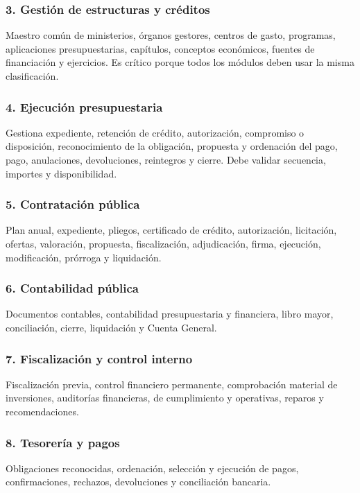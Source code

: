 \documentclass[11pt,a4paper]{article}
\begin{document}
\subsubsection{3. Gestión de estructuras y créditos}
Maestro común de ministerios, órganos gestores, centros de gasto, programas, aplicaciones presupuestarias, capítulos, conceptos económicos, fuentes de financiación y ejercicios. Es crítico porque todos los módulos deben usar la misma clasificación.

\subsubsection{4. Ejecución presupuestaria}
Gestiona expediente, retención de crédito, autorización, compromiso o disposición, reconocimiento de la obligación, propuesta y ordenación del pago, pago, anulaciones, devoluciones, reintegros y cierre. Debe validar secuencia, importes y disponibilidad.

\subsubsection{5. Contratación pública}
Plan anual, expediente, pliegos, certificado de crédito, autorización, licitación, ofertas, valoración, propuesta, fiscalización, adjudicación, firma, ejecución, modificación, prórroga y liquidación.

\subsubsection{6. Contabilidad pública}
Documentos contables, contabilidad presupuestaria y financiera, libro mayor, conciliación, cierre, liquidación y Cuenta General.

\subsubsection{7. Fiscalización y control interno}
Fiscalización previa, control financiero permanente, comprobación material de inversiones, auditorías financieras, de cumplimiento y operativas, reparos y recomendaciones.

\subsubsection{8. Tesorería y pagos}
Obligaciones reconocidas, ordenación, selección y ejecución de pagos, confirmaciones, rechazos, devoluciones y conciliación bancaria.
\end{document}
